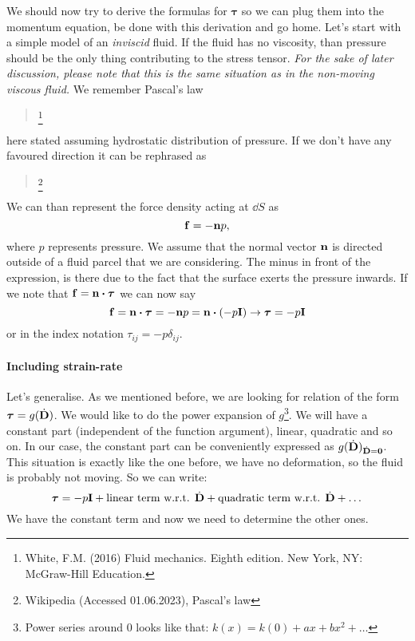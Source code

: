 \documentclass{article}
\begin{document}
We should now try to derive the formulas for \(\bm{\tau}\) so we can plug
them into the momentum equation, be done with this derivation and go home.
Let's start with a simple model of an \emph{inviscid} fluid. If the fluid
has no viscosity, than pressure should be the only thing contributing to 
the stress tensor. \emph{For the sake of later discussion, please note that 
this is the same situation as in the non-moving viscous fluid.} We remember
Pascal's law
\begin{quote}
  \footnote{%
  White, F.M. (2016) Fluid mechanics. Eighth edition. New York, 
  NY: McGraw-Hill Education.}
\end{quote}
here stated assuming hydrostatic distribution of pressure. If we don't have 
any favoured direction it can be rephrased as
\begin{quote}
  \footnote{%
    Wikipedia (Accessed 01.06.2023), Pascal's law}
\end{quote}
We can than represent the force density acting at \(\dd{S}\) as 
\[
  \vb{f} = -\vb{n}p,
\]
where \(p\) represents pressure. We assume that the normal vector \(\vb{n}\) is
directed outside of a fluid parcel that we are considering. The minus in front 
of the expression, is there due to the fact that the surface exerts the pressure
inwards. If we note that \(\vb{f} = \vb{n}\dotproduct\bm{\tau}\) we can now say
\[
  \vb{f} = \vb{n}\dotproduct\bm{\tau} = -\vb{n}p = \vb{n}\dotproduct \qty( -p\vb{I} ) 
  \rightarrow \bm{\tau} = -p \vb{I}
\]
or in the index notation \(\tau_{ij} = -p \delta_{ij}\).

\paragraph{Including strain-rate}
Let's generalise. As we mentioned before, we are looking for 
relation of the form \(\bm{\tau} = g(\dot{\vb{D}})\). We would like to do the
power expansion of \(g\)\footnote{Power series around 0 looks like that: 
\(k(x) = k(0) + ax + bx^2 + \dots\)}. We will have a constant part (independent 
of the function argument), linear, quadratic and so on. In our case, the 
constant part can be conveniently expressed as
\(g(\dot{\vb{D}})_{\dot{\vb{D}} = \vb{0}}\). This situation is exactly like the 
one before, we have no deformation, so the fluid is probably not moving. So
we can write:
\[
  \bm{\tau} = -p\vb{I} + \text{linear term w.r.t. } \dot{\vb{D}} 
                       + \text{quadratic term w.r.t. } \dot{\vb{D}} + \dots
\]
We have the constant term and now we need to determine the other ones.
\end{document}

